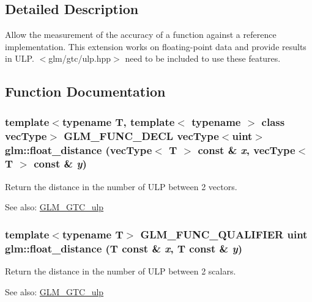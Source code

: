 \subsection{Detailed Description}
Allow the measurement of the accuracy of a function against a reference implementation. This extension works on floating-point data and provide results in ULP. $<$glm/gtc/ulp.hpp$>$ need to be included to use these features. 



\subsection{Function Documentation}
\hypertarget{group__gtc__ulp_g421b0584182815a9e9e64d74361e7409}{
\subsubsection[float\_\-distance]{\setlength{\rightskip}{0pt plus 5cm}template$<$typename T, template$<$ typename $>$ class vecType$>$ GLM\_\-FUNC\_\-DECL vecType$<$uint$>$ glm::float\_\-distance (vecType$<$ T $>$ const \& {\em x}, \/  vecType$<$ T $>$ const \& {\em y})}}
\label{group__gtc__ulp_g421b0584182815a9e9e64d74361e7409}


Return the distance in the number of ULP between 2 vectors. \begin{Desc}
\item[See also:]\hyperlink{group__gtc__ulp}{GLM\_\-GTC\_\-ulp} \end{Desc}
\hypertarget{group__gtc__ulp_g4cb4468c9654077d40266d039158206b}{
\subsubsection[float\_\-distance]{\setlength{\rightskip}{0pt plus 5cm}template$<$typename T$>$ GLM\_\-FUNC\_\-QUALIFIER uint glm::float\_\-distance (T const \& {\em x}, \/  T const \& {\em y})}}
\label{group__gtc__ulp_g4cb4468c9654077d40266d039158206b}


Return the distance in the number of ULP between 2 scalars. \begin{Desc}
\item[See also:]\hyperlink{group__gtc__ulp}{GLM\_\-GTC\_\-ulp} \end{Desc}


